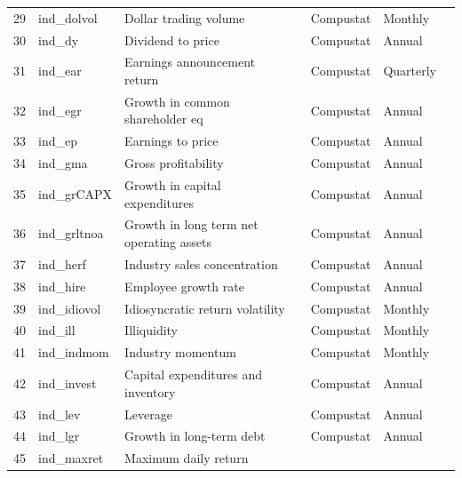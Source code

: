 \documentclass[11pt, a4paper, table]{article}
\begin{document}
\begin{landscape}
\begin{center}
\begin{longtable}{lllllll}
			29 & ind\_dolvol & Dollar trading volume & 
				\cite{chordia_trading_2001} & Compustat & Monthly \\
			30 & ind\_dy & Dividend to price & 
				\cite{litzenberger_effects_1982} & Compustat & Annual \\
			31 & ind\_ear & Earnings announcement return & 
				\cite{brandt_earnings_2008} & Compustat & Quarterly \\
			32 & ind\_egr & Growth in common shareholder eq & 
				\cite{richardson_accrual_2005} & Compustat & Annual \\
			33 & ind\_ep & Earnings to price & 
				\cite{basu_investment_1977} & Compustat & Annual \\
			34 & ind\_gma & Gross profitability & 
				\cite{novy-marx_other_2013} & Compustat & Annual \\
			35 & ind\_grCAPX\footnotemark[\value{footnote}] & Growth in capital expenditures & 
				\cite{anderson_empirical_2006} & Compustat & Annual \\
			36 & ind\_grltnoa\footnotemark[\value{footnote}] & Growth in long term net operating assets & 
				\cite{fairfield_accrued_2003} & Compustat & Annual \\
			37 & ind\_herf & Industry sales concentration & 
				\cite{hou_industry_2006} & Compustat & Annual \\
			38 & ind\_hire & Employee growth rate & 
				\cite{belo_labor_2014} & Compustat & Annual \\
			39 & ind\_idiovol & Idiosyncratic return volatility & 
				\cite{ali_arbitrage_2003} & Compustat & Monthly \\
			40 & ind\_ill & Illiquidity & 
				\cite{amihud_illiquidity_2002} & Compustat & Monthly \\
			41 & ind\_indmom & Industry momentum & 
				\cite{moskowitz_industries_1999} & Compustat & Monthly \\
			42 & ind\_invest\footnotemark[\value{footnote}] & Capital expenditures and inventory & 
				\cite{chen_better_2010} & Compustat & Annual \\
			43 & ind\_lev & Leverage & 
				\cite{bhandari_debt/equity_1988} & Compustat & Annual \\
			44 & ind\_lgr & Growth in long-term debt & 
				\cite{richardson_accrual_2005} & Compustat & Annual \\
			45 & ind\_maxret & Maximum daily return & 

\end{longtable}
\end{center}
\end{landscape}
\end{document}
